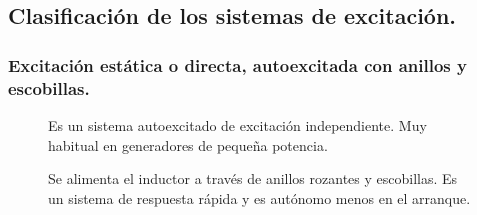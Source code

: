 		\subsection{Clasificación de los sistemas de excitación.}
			\subsubsection{Excitación estática o directa, autoexcitada con anillos y escobillas.}
				\begin{figure}[H]
					\begin{minipage}{0.3\textwidth}
						Es un sistema autoexcitado de excitación independiente. Muy habitual en generadores de pequeña potencia. 
						
						\vspace{0.25cm}
						Se alimenta el inductor a través de anillos rozantes y escobillas. Es un sistema de respuesta rápida y es autónomo menos en el arranque. 
						

\end{minipage}
\end{figure}
